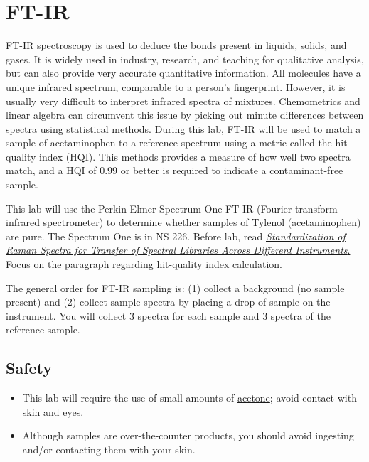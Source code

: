 \documentclass[]{tufte-book}
\providecommand{\tightlist}{%
  \setlength{\itemsep}{0pt}\setlength{\parskip}{0pt}}
\begin{document}
\newpage

\hypertarget{am-ftir}{%
\section{FT-IR}\label{am-ftir}}

FT-IR spectroscopy is used to deduce the bonds present in liquids, solids, and gases. It is widely used in industry, research, and teaching for qualitative analysis, but can also provide very accurate quantitative information. All molecules have a unique infrared spectrum, comparable to a person's fingerprint. However, it is usually very difficult to interpret infrared spectra of mixtures. Chemometrics and linear algebra can circumvent this issue by picking out minute differences between spectra using statistical methods. During this lab, FT-IR will be used to match a sample of acetaminophen to a reference spectrum using a metric called the hit quality index (HQI). This methods provides a measure of how well two spectra match, and a HQI of 0.99 or better is required to indicate a contaminant-free sample.

This lab will use the Perkin Elmer Spectrum One FT-IR (Fourier-transform infrared spectrometer) to determine whether samples of Tylenol (acetaminophen) are pure. The Spectrum One is in NS 226. Before lab, read \href{https://www.researchgate.net/publication/51602215_Standardization_of_Raman_spectra_for_transfer_of_spectral_libraries_across_different_instruments}{\emph{Standardization of Raman Spectra for Transfer of Spectral Libraries Across Different Instruments}.} Focus on the paragraph regarding hit-quality index calculation.

The general order for FT-IR sampling is: (1) collect a background (no sample present) and (2) collect sample spectra by placing a drop of sample on the instrument. You will collect 3 spectra for each sample and 3 spectra of the reference sample.

\hypertarget{safety-6}{%
\subsection*{Safety}\label{safety-6}}

\begin{itemize}
\tightlist
\item
  This lab will require the use of small amounts of \href{http://www.sciencelab.com/msds.php?msdsId=9927062}{acetone}; avoid contact with skin and eyes.
\item
  Although samples are over-the-counter products, you should avoid ingesting and/or contacting them with your skin.
\end{itemize}
\end{document}
